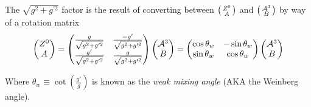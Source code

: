     The $\sqrt{g^2 + g^{\prime 2}}$ factor is the result of converting between
        $\big(\begin{smallmatrix} Z^0 \\ A \end{smallmatrix}\big)$ and $\big(\begin{smallmatrix} \mathcal{A}^3 \\ B \end{smallmatrix}\big)$ by way of a rotation matrix
    \begin{equation} \begin{split}
        \begin{pmatrix} Z^0 \\ A \end{pmatrix} =
        \begin{pmatrix}
            \frac{g}{\sqrt{g^2 + g^{\prime 2}}} & \frac{-g'}{\sqrt{g^2 + g^{\prime 2}}} \\
            \frac{g'}{\sqrt{g^2 + g^{\prime 2}}} & \frac{g}{\sqrt{g^2 + g^{\prime 2}}}
        \end{pmatrix} \begin{pmatrix} \mathcal{A}^3 \\ B \end{pmatrix} = 
        \begin{pmatrix}
            \cos\theta_w & -\sin\theta_w \\
            \sin\theta_w & \cos\theta_w
        \end{pmatrix} \begin{pmatrix} \mathcal{A}^3 \\ B \end{pmatrix}
    \end{split} \end{equation}

    Where $\theta_w \equiv \cot(\frac{g'}{g})$ is known as the \textit{weak mixing angle} (AKA the Weinberg angle).

